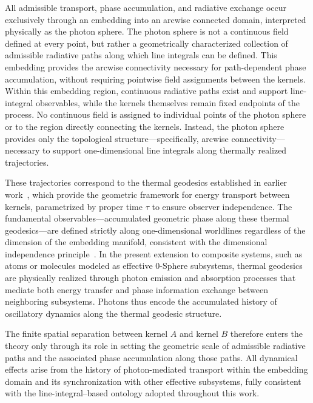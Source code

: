 \documentclass[
 reprint,
 amsmath,amssymb,
 aps,
 prb,
]{revtex4-2}
\numberwithin{equation}{section}
\begin{document}
All admissible transport, phase accumulation, and radiative exchange occur exclusively through an embedding into an arcwise connected domain, interpreted physically as the photon sphere. The photon sphere is not a continuous field defined at every point, but rather a geometrically characterized collection of admissible radiative paths along which line integrals can be defined. This embedding provides the arcwise connectivity necessary for path-dependent phase accumulation, without requiring pointwise field assignments between the kernels. Within this embedding region, continuous radiative paths exist and support line-integral observables, while the kernels themselves remain fixed endpoints of the process. No continuous field is assigned to individual points of the photon sphere or to the region directly connecting the kernels. Instead, the photon sphere provides only the topological structure---specifically, arcwise connectivity---necessary to support one-dimensional line integrals along thermally realized trajectories.

These trajectories correspond to the thermal geodesics established in earlier work~\cite{Hanamura2025Trilogy1}, which provide the geometric framework for energy transport between kernels, parametrized by proper time $\tau$ to ensure observer independence. The fundamental observables---accumulated geometric phase along these thermal geodesics---are defined strictly along one-dimensional worldlines regardless of the dimension of the embedding manifold, consistent with the dimensional independence principle~\cite{Hanamura2025Trilogy1}. In the present extension to composite systems, such as atoms or molecules modeled as effective 0-Sphere subsystems, thermal geodesics are physically realized through photon emission and absorption processes that mediate both energy transfer and phase information exchange between neighboring subsystems. Photons thus encode the accumulated history of oscillatory dynamics along the thermal geodesic structure.

The finite spatial separation between kernel $A$ and kernel $B$ therefore enters the theory only through its role in setting the geometric scale of admissible radiative paths and the associated phase accumulation along those paths. All dynamical effects arise from the history of photon-mediated transport within the embedding domain and its synchronization with other effective subsystems, fully consistent with the line-integral--based ontology adopted throughout this work.
\end{document}
